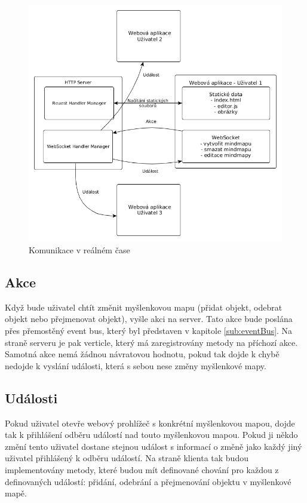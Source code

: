\begin{figure}
\begin{centering}
\includegraphics[width	=1\textwidth]{obrazky/realtime_communication}
\par\end{centering}
\caption{Komunikace v reálném čase\label{fig:realtime_communication}}
\end{figure}

\subsection{Akce}

Když bude uživatel chtít změnit myšlenkovou mapu (přidat objekt, odebrat objekt nebo přejmenovat objekt), vyšle akci na server. Tato akce bude poslána přes přemostěný event bus, který byl představen v kapitole \ref{sub:eventBus}. Na straně serveru je pak verticle, který má zaregistrovány metody na příchozí akce. Samotná akce nemá žádnou návratovou hodnotu, pokud tak dojde k chybě nedojde k vyslání události, která s sebou nese změny myšlenkové mapy.

\subsection{Události}

Pokud uživatel otevře webový prohlížeč s konkrétní myšlenkovou mapou, dojde tak k přihlášení odběru událostí nad touto myšlenkovou mapou. Pokud ji někdo změní tento uživatel dostane stejnou událost s informací o změně jako každý jiný uživatel přihlášený k odběru událostí.
Na straně klienta tak budou implementovány metody, které budou mít definované chování pro každou z definovaných událostí: přidání, odebrání a přejmenování objektu v myšlenkové mapě.

